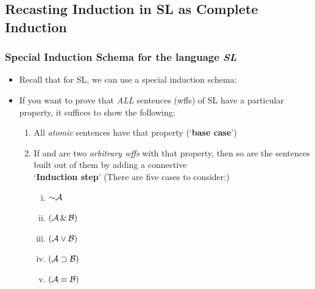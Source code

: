 

\subsection{Recasting Induction in SL as Complete Induction} 

\begin{frame}
\frametitle{Special Induction Schema for the language {\it{SL}}}

\begin{itemize}[<+->]

\item Recall that for SL, we can use a special induction schema: 

\item If you want to prove that \emph{ALL} sentences (wffs) of SL have a particular property, it suffices to show the following:

\begin{enumerate}[<+->]

\item All \emph{atomic} sentences have that property (`\textbf{base case}')

\item If  and  are two \emph{arbitrary wffs} with that property, then so are the sentences built out of them by adding a connective \\ \hspace{4em} `\textbf{Induction step}' (There are five cases to consider:) 

\begin{enumerate}[(i)]
  \item $\enot \metav{A}$
  \item $(\mathcal{A}\,\&\,\mathcal{B})$ 
  \item $(\mathcal{A}\vee\mathcal{B})$ 
  \item $(\mathcal{A}\supset\mathcal{B})$
  \item $(\mathcal{A}\equiv\mathcal{B})$

\end{enumerate}


\end{enumerate}



\end{itemize} 
\end{frame}


